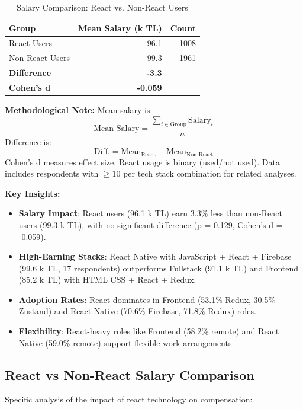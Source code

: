 \documentclass[12pt,a4paper]{article}
\begin{document}
\begin{table}[H]
	\centering
	\small
	\begin{tabular}{lrr}
		\toprule
		\textbf{Group}       & \textbf{Mean Salary (k TL)} & \textbf{Count} \\
		\midrule
		React Users          & 96.1                        & 1008           \\
		Non-React Users      & 99.3                        & 1961           \\
		\midrule
		\textbf{Difference}  & \textbf{-3.3}               &                \\
		\textbf{Cohen's d} & \textbf{-0.059}             &                \\
		\bottomrule
	\end{tabular}
	\caption{Salary Comparison: React vs. Non-React Users}
\end{table}

\textbf{Methodological Note:}
Mean salary is:
\[
	\text{Mean Salary} = \frac{\sum_{i \in \text{Group}} \text{Salary}_i}{n}
\]
Difference is:
\[
	\text{Diff.} = \text{Mean}_{\text{React}} - \text{Mean}_{\text{Non-React}}
\]
Cohen's d measures effect size. React usage is binary (used/not used). Data includes respondents with \(\geq 10\) per tech stack combination for related analyses.

\textbf{Key Insights:}
\begin{itemize}
	\item \textbf{Salary Impact}: React users (96.1 k TL) earn 3.3\% less than non-React users (99.3 k TL), with no significant difference (p = 0.129, Cohen's d = -0.059).
	\item \textbf{High-Earning Stacks}: React Native with JavaScript + React + Firebase (99.6 k TL, 17 respondents) outperforms Fullstack (91.1 k TL) and Frontend (85.2 k TL) with HTML CSS + React + Redux.
	\item \textbf{Adoption Rates}: React dominates in Frontend (53.1\% Redux, 30.5\% Zustand) and React Native (70.6\% Firebase, 71.8\% Redux) roles.
	\item \textbf{Flexibility}: React-heavy roles like Frontend (58.2\% remote) and React Native (59.0\% remote) support flexible work arrangements.
\end{itemize}

\subsection{React vs Non-React Salary Comparison}
Specific analysis of the impact of react technology on compensation:
\end{document}
